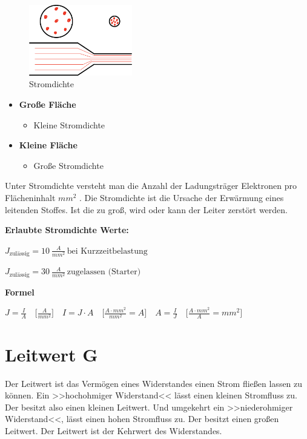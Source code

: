 \begin{figure}[!ht]%
\centering
\includegraphics[width=0.4\textwidth]{images/Skizze/04_Stromdichte_Skizze.pdf}
\caption{Stromdichte}
\end{figure}

\begin{itemize}
\item
  \textbf{Große Fläche}

  \begin{itemize}
  \item
    Kleine Stromdichte
  \end{itemize}
\item
  \textbf{Kleine Fläche}

  \begin{itemize}
  \item
    Große Stromdichte
  \end{itemize}
\end{itemize}

Unter Stromdichte versteht man die Anzahl der Ladungsträger Elektronen
pro Flächeninhalt $mm^2$ . Die Stromdichte ist die Ursache der
Erwärmung eines leitenden Stoffes. Ist die zu groß, wird oder kann der
Leiter zerstört werden.

\textbf{Erlaubte Stromdichte Werte:}

$J_{\text{zulässig}} = 10~\frac{A}{mm^2} \,\text{bei Kurzzeitbelastung}$

$J_{\text{zulässig}} = 30~\frac{A}{mm^2} \,\text{zugelassen (Starter)}$

\textbf{Formel}

$\boxed{J = \frac{I}{A}} \quad \bigl[\frac{A}{mm^2}\bigl] \quad  \boxed{I = J \cdot A} \quad \bigl[\frac{A \cdot mm^2}{mm^2} = A\bigl] \quad  \boxed{A = \frac{I}{J}} \quad \bigl[\frac{A \cdot mm^2}{A} = mm^2\bigl]$

\section{Leitwert G}\label{leitwert-g}

Der Leitwert ist das Vermögen eines Widerstandes einen Strom fließen
lassen zu können. Ein >>hochohmiger Widerstand<< lässt einen kleinen
Stromfluss zu. Der besitzt also einen kleinen Leitwert. Und umgekehrt
ein >>niederohmiger Widerstand<<, lässt einen hohen Stromfluss zu. Der
besitzt einen großen Leitwert. Der Leitwert ist der Kehrwert des
Widerstandes.

